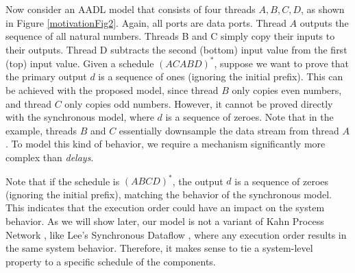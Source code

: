 Now consider an AADL model that consists of four threads $A, B, C, D$, as shown in Figure \ref{motivationFig2}. Again, all ports are data ports. Thread $A$ outputs the sequence of all natural numbers. Threads B and C simply copy their inputs to their outputs. Thread D subtracts the second (bottom) input value from the first (top) input value. Given a schedule $(ACABD)^*$, suppose we want to prove that the primary output $d$ is a sequence of ones (ignoring the initial prefix). This can be achieved with the proposed model, since thread $B$ only copies even numbers, and thread $C$ only copies odd numbers. However, it cannot be proved directly with the synchronous model, where $d$ is a sequence of zeroes. Note that in the example, threads $B$ and $C$ essentially downsample the data stream from thread $A$. To model this kind of behavior, we require a mechanism significantly more complex than \emph{delays}.

Note that if the schedule is $(ABCD)^*$, the output $d$ is a sequence of zeroes (ignoring the initial prefix), matching the behavior of the synchronous model. This indicates that the execution order could have an impact on the system behavior. As we will show later, our model is not a variant of Kahn Process Network \cite{KPN}, like Lee's Synchronous Dataflow \cite{SDF}, where any execution order results in the same system behavior. Therefore, it makes sense to tie a system-level property to a specific schedule of the components.


 
  